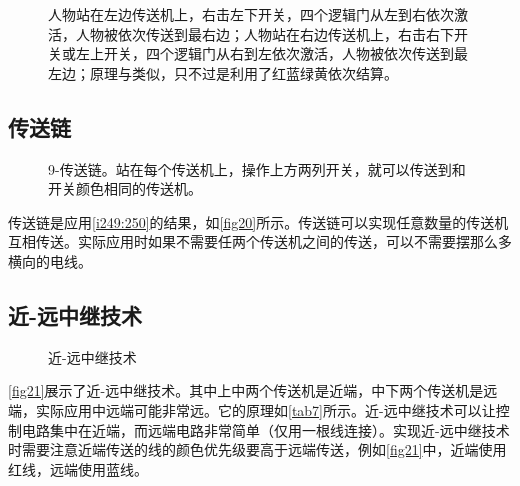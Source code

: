 \begin{figure}[!ht]
\begin{center}
%
%
\end{center}
\caption{\protect{}人物站在左边传送机上，右击左下开关，四个逻辑门从左到右依次激活，人物被依次传送到最右边；人物站在右边传送机上，右击右下开关或左上开关，四个逻辑门从右到左依次激活，人物被依次传送到最左边；\protect{}原理与\protect{}类似，只不过是利用了红蓝绿黄依次结算。}
\label{i249:252}
\end{figure}

\subsection{传送链}

\begin{figure}[!ht]
\centering
{}
\caption{9-传送链。站在每个传送机上，操作上方两列开关，就可以传送到和开关颜色相同的传送机。}\label{fig20}
\end{figure}

传送链是应用\autoref{i249:250}的结果，如\autoref{fig20}所示。传送链可以实现任意数量的传送机互相传送。实际应用时如果不需要任两个传送机之间的传送，可以不需要摆那么多横向的电线。

\subsection{近-远中继技术}\label{sec16}
\begin{figure}[!ht]
\centering
{}
\qquad
{}
\caption{近-远中继技术}
\end{figure}
\autoref{fig21}展示了近-远中继技术。其中上中两个传送机是近端，中下两个传送机是远端，实际应用中远端可能非常远。它的原理如\autoref{tab7}所示。近-远中继技术可以让控制电路集中在近端，而远端电路非常简单（仅用一根线连接）。实现近-远中继技术时需要注意近端传送的线的颜色优先级要高于远端传送，例如\autoref{fig21}中，近端使用红线，远端使用蓝线。

